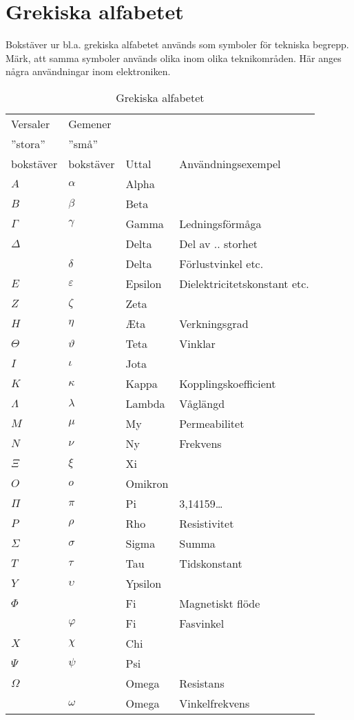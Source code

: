 \section{Grekiska alfabetet}

\begin{table}
  \caption{Grekiska alfabetet}

  Bokstäver ur bl.a. grekiska alfabetet används som symboler för
  tekniska begrepp.
  Märk, att samma symboler används olika inom olika teknikområden.
  Här anges några användningar inom elektroniken.

  \begin{tabular}{ll|l|l}
    Versaler  & Gemener   &       & \\
    ''stora'' & ''små''   &       & \\
    bokstäver & bokstäver & Uttal & Användningsexempel \\
    \hline
    \(A\) & \(\alpha\) & Alpha & \\
    \(B\) & \(\beta\) & Beta & \\
    \(\Gamma\) & \(\gamma\) & Gamma & Ledningsförmåga \\
    \(\Delta\) & & Delta & Del av .. storhet \\
    & \(\delta\) & Delta & Förlustvinkel etc. \\
    \(E\) & \(\varepsilon\) & Epsilon & Dielektricitetskonstant etc.\\
    \(Z\) & \(\zeta\) & Zeta & \\
    \(H\) & \(\eta\) & \AE ta & Verkningsgrad\\
    \(\Theta\) & \(\vartheta\) & Teta & Vinklar \\
    \(I\) & \(\iota\) & Jota & \\
    \(K\) & \(\kappa\) & Kappa & Kopplingskoefficient \\
    \(\Lambda\) & \(\lambda\) & Lambda & Våglängd \\
    \(M\) & \(\mu\) & My & Permeabilitet \\
    \(N\) & \(\nu\) & Ny & Frekvens \\
    \(\Xi\) & \(\xi\) & Xi & \\
    \(O\) & \(o\) & Omikron & \\
    \(\Pi\) & \(\pi\) & Pi & 3,14159\dots \\
    \(P\) & \(\rho\) & Rho & Resistivitet \\
    \(\Sigma\) & \(\sigma\) & Sigma & Summa \\
    \(T\) & \(\tau\) & Tau & Tidskonstant \\
    \(Y\) & \(\upsilon\) & Ypsilon &  \\
    \(\Phi\) & & Fi & Magnetiskt flöde \\
    & \(\varphi\) & Fi & Fasvinkel \\
    \(X\) & \(\chi\) & Chi & \\
    \(\Psi\) & \(\psi\) & Psi & \\
    \(\Omega\) & & Omega & Resistans \\
    & \(\omega\) & Omega & Vinkelfrekvens \\
  \end{tabular}
\end{table}
